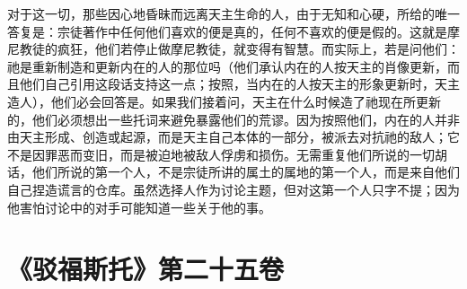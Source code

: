 对于这一切，那些因心地昏昧而远离天主生命的人，由于无知和心硬，所给的唯一答复是：宗徒著作中任何他们喜欢的便是真的，任何不喜欢的便是假的。这就是摩尼教徒的疯狂，他们若停止做摩尼教徒，就变得有智慧。而实际上，若是问他们：祂是重新制造和更新内在的人的那位吗（他们承认内在的人按天主的肖像更新，而且他们自己引用这段话支持这一点；按照，当内在的人按天主的形象更新时，天主造人），他们必会回答是。如果我们接着问，天主在什么时候造了祂现在所更新的，他们必须想出一些托词来避免暴露他们的荒谬。因为按照他们，内在的人并非由天主形成、创造或起源，而是天主自己本体的一部分，被派去对抗祂的敌人；它不是因罪恶而变旧，而是被迫地被敌人俘虏和损伤。无需重复他们所说的一切胡话，他们所说的第一个人，不是宗徒所讲的属土的属地的第一个人，而是来自他们自己捏造谎言的仓库。虽然选择人作为讨论主题，但对这第一个人只字不提；因为他害怕讨论中的对手可能知道一些关于他的事。\par



\section{《驳福斯托》第二十五卷}

\par

